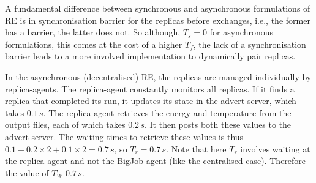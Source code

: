 \documentclass{rspublic}
\newcommand{\alnote}[1]{ {\textcolor{blue} { ***andre: #1 }}}
\newcommand{\athotanote}[1]{ {\textcolor{green} { ***athota: #1 }}}
\newcommand{\alnote}[1]{}
\newcommand{\athotanote}[1]{}
\begin{document}
A fundamental difference between synchronous and asynchronous
formulations of RE is in synchronisation barrier for the replicas
before exchanges, i.e., the former has a barrier, the latter does not.
So although, $T_s = 0$ for asynchronous formulations, this comes at
the cost of a higher $T_f$, the lack of a synchronisation barrier
leads to a more involved implementation to dynamically pair replicas.

In the asynchronous (decentralised) RE, the replicas are managed
individually by replica-agents. The replica-agent constantly monitors
all replicas. If it finds a replica that completed its run, it updates
its state in the advert server, which takes $0.1\,s$.  The
replica-agent retrieves the energy and temperature from the output
files, each of which takes $0.2\,s$. It then posts both these values
to the advert server.  The waiting times to retrieve these values is
thus $0.1+0.2\times2+0.1\times2=0.7\,s$, so $T_r = 0.7\,s$.  Note that
here $T_r$ involves waiting at the replica-agent and not the BigJob
agent (like the centralised case).  Therefore the value of $T_W$ 
$0.7\,s$.



\end{document}
